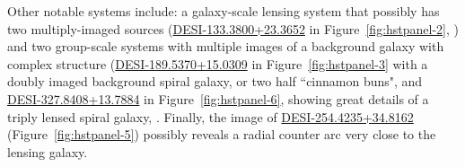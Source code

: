 {%
Other notable systems include: 
a galaxy-scale lensing system that possibly has two multiply-imaged sources (\href{https://www.legacysurvey.org/viewer/?ra=133.3800&dec=+23.3653&layer=ls-dr9&pixscale=0.262&zoom=16}{DESI-133.3800+23.3652} in Figure~\ref{fig:hstpanel-2}, )
and two group-scale systems with multiple images of a background galaxy with complex structure 
(\href{https://www.legacysurvey.org/viewer/?ra=189.5370&dec=15.0309&layer=ls-dr9&pixscale=0.262&zoom=16}{DESI-189.5370+15.0309} in Figure~\ref{fig:hstpanel-3} with a doubly imaged background spiral galaxy, 
or two half ``cinnamon buns", and 
\href{https://www.legacysurvey.org/viewer/?ra=327.8408&dec=13.7884&layer=ls-dr9&pixscale=0.262&zoom=16}{DESI-327.8408+13.7884} in Figure~\ref{fig:hstpanel-6}, showing great details of a triply lensed spiral galaxy, .
Finally, the \hst image of \href{https://www.legacysurvey.org/viewer/?ra=254.4235&dec=34.8161&layer=ls-dr9&pixscale=0.262&zoom=16}{DESI-254.4235+34.8162} (Figure~\ref{fig:hstpanel-5}) possibly reveals a radial counter arc very close to the lensing galaxy.

}
